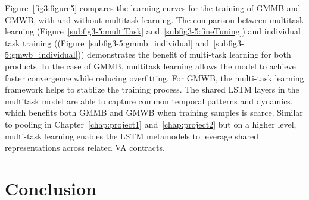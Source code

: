 Figure~\ref{fig3:figure5} compares the learning curves for the training of GMMB and GMWB, with and without multitask learning.
The comparison between multitask learning (Figure~\ref{subfig3-5:multiTask} and~\ref{subfig3-5:fineTuning}) and individual task training ((Figure~\ref{subfig3-5:gmmb_individual} and~\ref{subfig3-5:gmwb_individual})) demonstrates the benefit of multi-task learning for both products. 
In the case of GMMB, multitask learning allows the model to achieve faster convergence while reducing overfitting.
For GMWB, the multi-task learning framework helps to stablize the training process.
The shared LSTM layers in the multitask model are able to capture common temporal patterns and dynamics, which benefits both GMMB and GMWB when training samples is scarce.
Similar to pooling in Chapter~\ref{chap:project1} and~\ref{chap:project2} but on a higher level, multi-task learning enables the LSTM metamodels to leverage shared representations across related VA contracts.

\subsection{}



\section{Conclusion} \label{sec3:conclusion}

